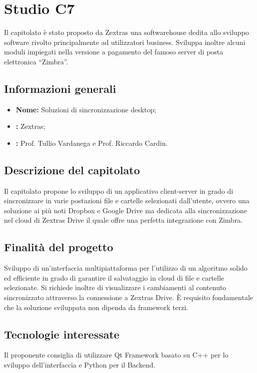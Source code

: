 \section{Studio C7} \label{_c7}

Il capitolato è stato proposto da Zextras una softwarehouse dedita allo sviluppo software rivolto principalmente ad utilizzatori business.
Sviluppa inoltre alcuni moduli impiegati nella versione a pagamento del famoso server di posta elettronica “Zimbra”.

\subsection{Informazioni generali}
\begin{itemize}
	\item \textbf{Nome:} Soluzioni di sincronizzazione desktop;
	\item \textbf{:} Zextras;
	\item \textbf{:} Prof. Tullio Vardanega e Prof. Riccardo Cardin.
\end{itemize}

\subsection{Descrizione del capitolato}
Il capitolato propone lo sviluppo di un applicativo client-server in grado di sincronizzare in varie postazioni file e cartelle selezionati dall’utente, ovvero una soluzione ai più noti Dropbox e Google Drive ma dedicata alla sincronizzazione nel cloud di Zextras Drive il quale offre una perfetta integrazione con Zimbra.

\subsection{Finalità del progetto}
Sviluppo di un’interfaccia multipiattaforma per l’utilizzo di un algoritmo solido ed efficiente in grado di garantire il salvataggio in cloud di file e cartelle selezionate.
Si richiede inoltre di visualizzare i cambiamenti al contenuto sincronizzato attraverso la connessione a Zextras Drive. È requisito fondamentale che la soluzione sviluppata non dipenda da framework terzi.


\subsection{Tecnologie interessate}
Il proponente consiglia di utilizzare Qt Framework basato su C++ per lo sviluppo dell’interfaccia e Python per il Backend.

